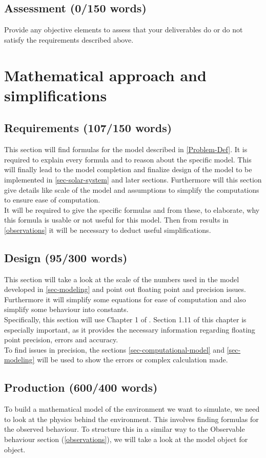 \documentclass[conference,compsoc]{IEEEtran}
\begin{document}
\subsection{Assessment (0/150 words)}
Provide any objective elements to assess that your deliverables do or do not satisfy the requirements described above. 

\section{Mathematical approach and simplifications}
\label{sec-simplify}
\subsection{Requirements (107/150 words)}
This section will find formulas for the model described in \ref{Problem-Def}. It is required to explain every formula and to reason about the specific model. This will finally lead to the model completion and finalize design of the model to be implemented in \ref{sec-solar-system} and later sections. Furthermore will this section give details like scale of the model and assumptions to simplify the computations to ensure ease of computation. \\
It will be required to give the specific formulas and from these, to elaborate, why this formula is usable or not useful for this model. Then from results in \ref{observations} it will be necessary to deduct useful simplifications.
\subsection{Design (95/300 words)}
This section will take a look at the scale of the numbers used in the model developed in \ref{sec-modeling} and point out floating point and precision issues. Furthermore it will simplify some equations for ease of computation and also simplify some behaviour into constants.\\
Specifically, this section will use Chapter 1 of \cite{ComputationalModelsIntroduction}. Section 1.11 of this chapter is especially important, as it provides the necessary information regarding floating point precision, errors and accuracy. \\
To find issues in precision, the sections \ref{sec-computational-model} and \ref{sec-modeling} will be used to show the errors or complex calculation made.
\subsection{Production (600/400 words)}
To build a mathematical model of the environment we want to simulate, we need to look at the physics behind the environment. This involves finding formulas for the observed behaviour. To structure this in a similar way to the Observable behaviour section (\ref{observations}), we will take a look at the model object for object.
\end{document}
